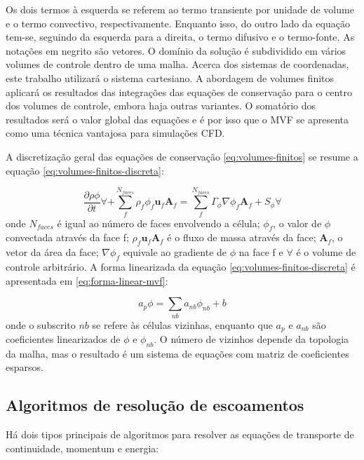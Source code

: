 Os dois termos à esquerda se referem ao termo transiente por unidade de volume e o termo convectivo, respectivamente. Enquanto isso, do outro lado da equação tem-se, seguindo da esquerda para a direita, o termo difusivo e o termo-fonte. As notações em negrito são vetores. O domínio da solução é subdividido em vários volumes de controle dentro de uma malha. Acerca dos sistemas de coordenadas, este trabalho utilizará o sistema cartesiano. A abordagem de volumes finitos aplicará os resultados das integrações das equações de conservação para o centro dos volumes de controle, embora haja outras variantes. O somatório dos resultados será o valor global das equações e é por isso que o MVF se apresenta como uma técnica vantajosa para simulações CFD.

A discretização geral das equações de conservação \ref{eq:volumes-finitos} se resume a equação \ref{eq:volumes-finitos-discreta}:

\begin{equation}
    \label{eq:volumes-finitos-discreta}
    \frac{\partial \rho\phi}{\partial t}\forall + \sum_{f}^{N_{faces}}\rho_{f}\phi_{f}\boldsymbol{u}_f\boldsymbol{A}_{f} = \sum_{f}^{N_{faces}}\Gamma_{\phi}\nabla\phi_{f}\boldsymbol{A}_{f} + S_{\phi}\forall
\end{equation}
%
onde \(N_{faces}\) é igual ao número de faces envolvendo a célula; \(\phi_f\), o valor de \(\phi\) convectada através da face f; \(\rho_f\boldsymbol{u}_f\textbf{A}_f\) é o fluxo de massa através da face; \(\textbf{A}_f\), o vetor da área da face; \(\nabla\phi_f\) equivale ao gradiente de \(\phi\) na face f e \(\forall\) é o volume de controle arbitrário. A forma linearizada da equação \ref{eq:volumes-finitos-discreta} é apresentada em \ref{eq:forma-linear-mvf}:

\begin{equation}
    \label{eq:forma-linear-mvf}
    a_{p}\phi = \sum_{nb}a_{nb}\phi_{nb} + b
\end{equation}
%
onde o subscrito \(nb\) se refere às células vizinhas, enquanto que \(a_{p}\) e \(a_{nb}\) são coeficientes linearizados de \(\phi\) e \(\phi_{nb}\). O número de vizinhos depende da topologia da malha, mas o resultado é um sistema de equações com matriz de coeficientes esparsos.

\subsection{Algoritmos de resolução de escoamentos}

Há dois tipos principais de algoritmos para resolver as equações de transporte de continuidade, momentum e energia:

